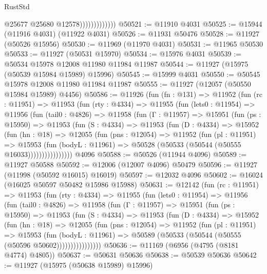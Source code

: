 \begin{lexlean}{RustStd}
\begin{coremodule}
                              @25677
                              @25680
                              @12578)))))))))))))
@50521 := @11910 @4031
@50525 := @15944 (@11916 @4031) (@11922 @4031)
@50526 := @11931 @50476
@50528 := @11927 (@50526 @15956)
@50530 := @11969 (@11970 @4031)
@50531 := @11965 @50530
@50533 := @11927 (@50531 @15970)
@50534 := @15976 @4031
@50539 := @50534 @15978 @12008 @11980 @11984 @11987
@50544 := @11927 (@15975 (@50539 @15984 @15989) @15996)
@50545 := @15999 @4031
@50550 := @50545 @15978 @12008 @11980 @11984 @11987
@50555 := @11927 (@12057 (@50550 @15984 @15989) @4456)
@50586 := @11926
    (fun (fn : @131) =>
    @11952
      (fun (rc : @11951) =>
      @11953
        (fun (rty : @4334) =>
        @11955
          (fun (lets0 : @11954) =>
          @11956
            (fun (tail0 : @4826) =>
            @11958
              (fun (Γ : @11957) =>
              @15951
                (fun (ps : @15950) =>
                @11953
                  (fun (S : @4334) =>
                  @11953
                    (fun (D : @4334) =>
                    @15952
                      (fun (hn : @18) =>
                      @12055
                        (fun (pns : @12054) =>
                        @11952
                          (fun (pl : @11951) =>
                          @15953
                            (fun (bodyL : @11961) =>
                            @50528 (@50533 (@50544 (@50555 @16033))))))))))))))))
    @4096
@50588 := @50526 (@11944 @4096)
@50589 := @11927 @50588
@50592 := @12006 (@12007 @4096) @50479
@50596 := @11927 (@11998 (@50592 @16015) @16019)
@50597 := @12032 @4096
@50602 := @16024 (@16025 @50597 @50482 @15986 @15988)
@50631 := @12142
    (fun (rc : @11951) =>
    @11953
      (fun (rty : @4334) =>
      @11955
        (fun (lets0 : @11954) =>
        @11956
          (fun (tail0 : @4826) =>
          @11958
            (fun (Γ : @11957) =>
            @15951
              (fun (ps : @15950) =>
              @11953
                (fun (S : @4334) =>
                @11953
                  (fun (D : @4334) =>
                  @15952
                    (fun (hn : @18) =>
                    @12055
                      (fun (pns : @12054) =>
                      @11952
                        (fun (pl : @11951) =>
                        @15953
                          (fun (bodyL : @11961) =>
                          @50589 (@50533 (@50544 (@50555 (@50596 @50602))))))))))))))))
@50636 := @11169 (@6956 (@4795 (@8181 @4774) @4805))
@50637 := @50631 @50636
@50638 := @50539 @50636
@50642 := @11927 (@15975 (@50638 @15989) @15996)

\end{coremodule}
\end{lexlean}
